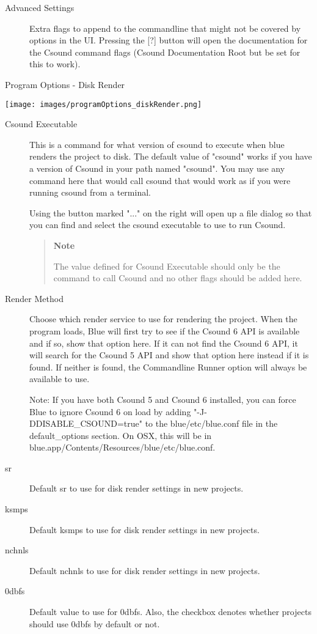 \begin{description}
\item[Advanced Settings]
Extra flags to append to the commandline that might not be covered by
options in the UI. Pressing the {[}?{]} button will open the
documentation for the Csound command flags (Csound Documentation Root
but be set for this to work).
\end{description}

Program Options - Disk Render

\texttt{[image: images/programOptions\_diskRender.png]}

\begin{description}
\item[Csound Executable]
This is a command for what version of csound to execute when blue
renders the project to disk. The default value of "csound" works if you
have a version of Csound in your path named "csound". You may use any
command here that would call csound that would work as if you were
running csound from a terminal.

Using the button marked "..." on the right will open up a file dialog so
that you can find and select the csound executable to use to run Csound.

\begin{quote}
\textbf{Note}

The value defined for Csound Executable should only be the command to
call Csound and no other flags should be added here.
\end{quote}
\item[Render Method]
Choose which render service to use for rendering the project. When the
program loads, Blue will first try to see if the Csound 6 API is
available and if so, show that option here. If it can not find the
Csound 6 API, it will search for the Csound 5 API and show that option
here instead if it is found. If neither is found, the Commandline Runner
option will always be available to use.

Note: If you have both Csound 5 and Csound 6 installed, you can force
Blue to ignore Csound 6 on load by adding "-J-DDISABLE\_CSOUND=true" to
the blue/etc/blue.conf file in the default\_options section. On OSX,
this will be in blue.app/Contents/Resources/blue/etc/blue.conf.
\item[sr]
Default sr to use for disk render settings in new projects.
\item[ksmps]
Default ksmps to use for disk render settings in new projects.
\item[nchnls]
Default nchnls to use for disk render settings in new projects.
\item[0dbfs]
Default value to use for 0dbfs. Also, the checkbox denotes whether
projects should use 0dbfs by default or not.
\end{description}

